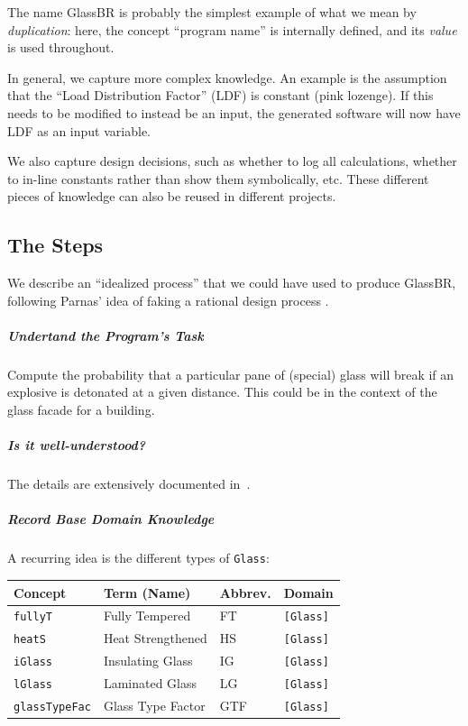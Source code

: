 \documentclass[a4paper,UKenglish,cleveref,autoref,thm-restate]{oasics-v2021}
\begin{document}
The name GlassBR is probably the simplest example of what we mean by
\emph{duplication}: here, the concept ``program name'' is internally defined, and
its \emph{value} is used throughout. 

In general, we capture more complex knowledge. An example is the assumption
that the ``Load Distribution Factor'' (LDF) is constant (pink lozenge). If this
needs to be modified to instead be an input, the generated software will now
have LDF as an input variable.  

We also capture design decisions, such as
whether to log all calculations, whether to in-line constants rather than show
them symbolically, etc. These different pieces of knowledge can also be reused
in different projects.

\subsection{The Steps}
We describe an ``idealized process'' that we could have used to produce GlassBR,
following Parnas' idea of faking a rational design process \cite{Parnas1986}.

\subparagraph*{Undertand the Program's Task} Compute the probability that a
particular pane of (special) glass will break if an explosive is detonated at a
given distance.  This could be in the context of the glass facade for a
building.

\subparagraph*{Is it well-understood?} The details are extensively documented
in~\cite{ASTM2009, ASTM2015, BeasonEtAl1998}.

\subparagraph*{Record Base Domain Knowledge}
A recurring idea is the different types of \texttt{Glass}:
\begin{center}
  \begin{tabular}{|l|l|l|l|}
    \hline
    \textbf{Concept} & \textbf{Term (Name)} & \textbf{Abbrev.} & \textbf{Domain} \\ \hline
    \texttt{fullyT} & Fully Tempered & FT & \texttt{[Glass]} \\ \hline
    \texttt{heatS} & Heat Strengthened & HS & \texttt{[Glass]} \\ \hline
    \texttt{iGlass} & Insulating Glass & IG & \texttt{[Glass]} \\ \hline
    \texttt{lGlass} & Laminated Glass & LG & \texttt{[Glass]} \\ \hline
    \texttt{glassTypeFac} & Glass Type Factor & GTF & \texttt{[Glass]} \\ \hline
  \end{tabular}
\end{center}
\end{document}
